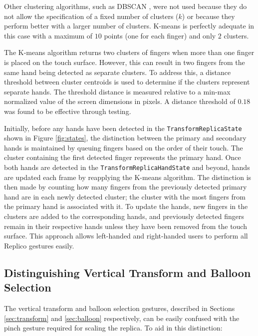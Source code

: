         Other clustering algorithms, such as DBSCAN \cite{ester1996density}, were not used because they do not allow the specification of a fixed number of clusters ($k$) or because they perform better with a larger number of clusters. K-means is perfectly adequate in this case with a maximum of $10$ points (one for each finger) and only $2$ clusters.
    
        The K-means algorithm returns two clusters of fingers when more than one finger is placed on the touch surface. However, this can result in two fingers from the same hand being detected as separate clusters. To address this, a distance threshold between cluster centroids is used to determine if the clusters represent separate hands. The threshold distance is measured relative to a min-max normalized value of the screen dimensions in pixels. A distance threshold of $0.18$ was found to be effective through testing.
    
        Initially, before any hands have been detected in the \lstinline{TransformReplicaState} shown in Figure \ref{fig:states}, the distinction between the primary and secondary hands is maintained by queuing fingers based on the order of their touch. The cluster containing the first detected finger represents the primary hand. Once both hands are detected in the \lstinline{TransformReplicaHandState} and beyond, hands are updated each frame by reapplying the K-means algorithm. The distinction is then made by counting how many fingers from the previously detected primary hand are in each newly detected cluster; the cluster with the most fingers from the primary hand is associated with it. To update the hands, new fingers in the clusters are added to the corresponding hands, and previously detected fingers remain in their respective hands unless they have been removed from the touch surface. This approach allows left-handed and right-handed users to perform all Replico gestures easily.

    \subsection{Distinguishing Vertical Transform and Balloon Selection} \label{sec:vertical_balloon}
    
        The vertical transform and balloon selection gestures, described in Sections \ref{sec:transform} and \ref{sec:balloon} respectively, can be easily confused with the pinch gesture required for scaling the replica. To aid in this distinction:
    
